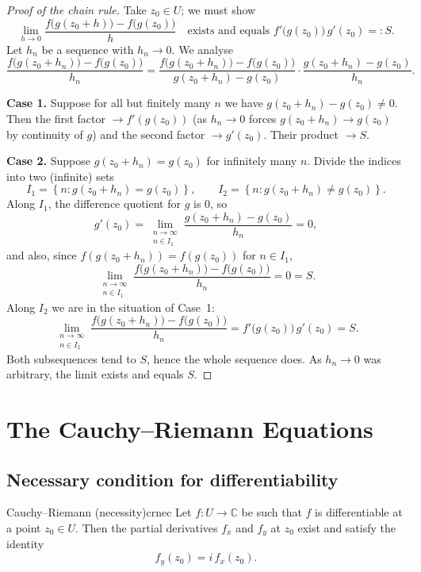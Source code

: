 \documentclass[11pt,openany]{report}
\newcommand{\C}{\mathbb{C}}
\newcommand{\set}[1]{\left\{ #1 \right\}}
\begin{document}
\begin{proof}[Proof of the chain rule]
Take $z_0\in U$; we must show
\[
  \lim_{h\to0} \frac{f\bigl(g(z_0+h)\bigr) - f\bigl(g(z_0)\bigr)}{h}
  \quad\text{exists and equals } f'\!\bigl(g(z_0)\bigr)\,g'(z_0) =: S.
\]
Let $h_n$ be a sequence with $h_n\to0$. We analyse
\[
  \frac{f\bigl(g(z_0+h_n)\bigr) - f\bigl(g(z_0)\bigr)}{h_n}
  = \frac{f\bigl(g(z_0+h_n)\bigr) - f\bigl(g(z_0)\bigr)}{g(z_0+h_n)-g(z_0)}
    \cdot \frac{g(z_0+h_n)-g(z_0)}{h_n}.
\]

\textbf{Case 1.} Suppose for all but finitely many $n$ we have $g(z_0+h_n)-g(z_0)\ne0$.
Then the first factor $\to f'(g(z_0))$ (as $h_n\to0$ forces $g(z_0+h_n)\to g(z_0)$ by
continuity of $g$) and the second factor $\to g'(z_0)$. Their product $\to S$.

\textbf{Case 2.} Suppose $g(z_0+h_n)=g(z_0)$ for infinitely many $n$. Divide the indices
into two (infinite) sets
\[
  I_1 = \set{ n : g(z_0+h_n) = g(z_0) }, \qquad
  I_2 = \set{ n : g(z_0+h_n) \ne g(z_0) }.
\]
Along $I_1$, the difference quotient for $g$ is $0$, so
\[
  g'(z_0) = \lim_{\substack{n\to\infty\\ n\in I_1}} \frac{g(z_0+h_n)-g(z_0)}{h_n} = 0,
\]
and also, since $f(g(z_0+h_n))=f(g(z_0))$ for $n\in I_1$,
\[
  \lim_{\substack{n\to\infty\\ n\in I_1}} \frac{f\bigl(g(z_0+h_n)\bigr) - f\bigl(g(z_0)\bigr)}{h_n} = 0 = S.
\]
Along $I_2$ we are in the situation of Case~1:
\[
  \lim_{\substack{n\to\infty\\ n\in I_2}} \frac{f\bigl(g(z_0+h_n)\bigr) - f\bigl(g(z_0)\bigr)}{h_n}
  = f'\!\bigl(g(z_0)\bigr)\,g'(z_0) = S.
\]
Both subsequences tend to $S$, hence the whole sequence does. As $h_n\to0$ was arbitrary,
the limit exists and equals $S$.
\end{proof}


\chapter{The Cauchy--Riemann Equations}

\section{Necessary condition for differentiability}

\begin{theorem}{Cauchy--Riemann (necessity)}{crnec}
Let $f:U\to\C$ be such that $f$ is differentiable at a point $z_0\in U$. Then the partial
derivatives $f_x$ and $f_y$ at $z_0$ exist and satisfy the identity
\[
  \boxed{\,f_y(z_0) = i\,f_x(z_0).\,}
\]
\end{theorem}
\end{document}

